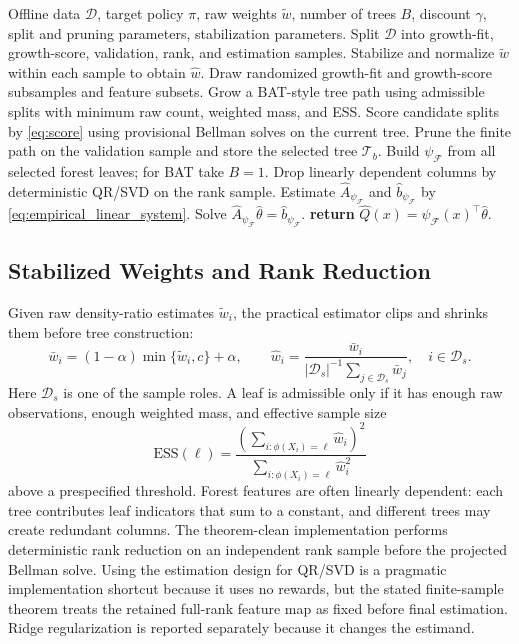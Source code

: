 \documentclass{article}
\newcommand{\cD}{\mathcal D}
\newcommand{\cT}{\mathcal T}
\newcommand{\cF}{\mathcal F}
\newcommand{\hatA}{\widehat A}
\newcommand{\hatb}{\widehat b}
\theoremstyle{plain}
\theoremstyle{definition}
\theoremstyle{remark}
\begin{document}
\begin{algorithm}[t]
\caption{Target-Weighted Bellman Aggregation Forest}
\label{alg:baf}
\begin{algorithmic}[1]
\REQUIRE Offline data \(\cD\), target policy \(\pi\), raw weights
\(\tilde w\), number of trees \(B\), discount \(\gamma\), split and pruning
parameters, stabilization parameters.
\STATE Split \(\cD\) into growth-fit, growth-score, validation, rank, and estimation samples.
\STATE Stabilize and normalize \(\tilde w\) within each sample to obtain \(\hat w\).
  \STATE Draw randomized growth-fit and growth-score subsamples and feature subsets.
  \STATE Grow a BAT-style tree path using admissible splits with minimum raw count, weighted mass, and ESS.
  \STATE Score candidate splits by \eqref{eq:score} using provisional Bellman solves on the current tree.
  \STATE Prune the finite path on the validation sample and store the selected tree \(\cT_b\).
\ENDFOR
\STATE Build \(\psi_{\cF}\) from all selected forest leaves; for BAT take \(B=1\).
\STATE Drop linearly dependent columns by deterministic QR/SVD on the rank sample.
\STATE Estimate \(\hatA_{\psi_{\cF}}\) and \(\hatb_{\psi_{\cF}}\) by \eqref{eq:empirical_linear_system}.
\STATE Solve \(\hatA_{\psi_{\cF}}\hat\theta=\hatb_{\psi_{\cF}}\).
\STATE \textbf{return} \(\hat Q(x)=\psi_{\cF}(x)^\top\hat\theta\).
\end{algorithmic}
\end{algorithm}

\subsection{Stabilized Weights and Rank Reduction}

Given raw density-ratio estimates \(\tilde w_i\), the practical estimator clips
and shrinks them before tree construction:
\[
  \bar w_i=(1-\alpha)\min\{\tilde w_i,c\}+\alpha,\qquad
  \hat w_i=\frac{\bar w_i}{|\cD_s|^{-1}\sum_{j\in\cD_s}\bar w_j},
  \quad i\in\cD_s .
\]
Here \(\cD_s\) is one of the sample roles. A leaf is admissible only if it
has enough raw observations, enough weighted mass, and effective sample size
\[
  \mathrm{ESS}(\ell)
  =
  \frac{\left(\sum_{i:\phi(X_i)=\ell}\hat w_i\right)^2}
       {\sum_{i:\phi(X_i)=\ell}\hat w_i^2}
\]
above a prespecified threshold. Forest features are often linearly dependent:
each tree contributes leaf indicators that sum to a constant, and different
trees may create redundant columns. The theorem-clean implementation performs
deterministic rank reduction on an independent rank sample before the projected
Bellman solve. Using the estimation design for QR/SVD is a pragmatic
implementation shortcut because it uses no rewards, but the stated
finite-sample theorem treats the retained full-rank feature map as fixed before
final estimation. Ridge regularization is reported separately because it
changes the estimand.
\end{document}
